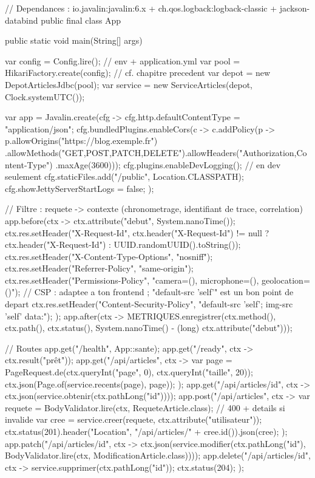 \begin{codejava}
// Dependances : io.javalin:javalin:6.x + ch.qos.logback:logback-classic + jackson-databind
public final class App {
    public static void main(String[] args) {
        var config = Config.lire();                          // env + application.yml
        var pool = HikariFactory.create(config);              // cf. chapitre precedent
        var depot = new DepotArticlesJdbc(pool);
        var service = new ServiceArticles(depot, Clock.systemUTC());

        var app = Javalin.create(cfg -> {
            cfg.http.defaultContentType = "application/json";
            cfg.bundledPlugins.enableCors(c -> c.addPolicy(p -> p.allowOrigins("https://blog.exemple.fr")
                    .allowMethods("GET,POST,PATCH,DELETE").allowHeaders("Authorization,Content-Type")
                    .maxAge(3600)));
            cfg.plugins.enableDevLogging();                   // en dev seulement
            cfg.staticFiles.add("/public", Location.CLASSPATH);
            cfg.showJettyServerStartLogs = false;
        });

        // Filtre : requete -> contexte (chronometrage, identifiant de trace, correlation)
        app.before(ctx -> {
            ctx.attribute("debut", System.nanoTime());
            ctx.res.setHeader("X-Request-Id", ctx.header("X-Request-Id") != null
                    ? ctx.header("X-Request-Id") : UUID.randomUUID().toString());
            ctx.res.setHeader("X-Content-Type-Options", "nosniff");
            ctx.res.setHeader("Referrer-Policy", "same-origin");
            ctx.res.setHeader("Permissions-Policy", "camera=(), microphone=(), geolocation=()");
            // CSP : adaptee a ton frontend ; "default-src 'self'" est un bon point de depart
            ctx.res.setHeader("Content-Security-Policy", "default-src 'self'; img-src 'self' data:");
        });
        app.after(ctx -> METRIQUES.enregistrer(ctx.method(), ctx.path(), ctx.status(),
                System.nanoTime() - (long) ctx.attribute("debut")));

        // Routes
        app.get("/health", App::sante);
        app.get("/ready", ctx -> ctx.result("pr\^et"));
        app.get("/api/articles", ctx -> {
            var page = PageRequest.de(ctx.queryInt("page", 0), ctx.queryInt("taille", 20));
            ctx.json(Page.of(service.recents(page), page));
        });
        app.get("/api/articles/{id}", ctx -> ctx.json(service.obtenir(ctx.pathLong("id"))));
        app.post("/api/articles", ctx -> {
            var requete = BodyValidator.lire(ctx, RequeteArticle.class);      // 400 + details si invalide
            var cree = service.creer(requete, ctx.attribute("utilisateur"));
            ctx.status(201).header("Location", "/api/articles/" + cree.id()).json(cree);
        });
        app.patch("/api/articles/{id}", ctx -> ctx.json(service.modifier(ctx.pathLong("id"),
                BodyValidator.lire(ctx, ModificationArticle.class))));
        app.delete("/api/articles/{id}", ctx -> { service.supprimer(ctx.pathLong("id")); ctx.status(204); });

}}
\end{codejava}
